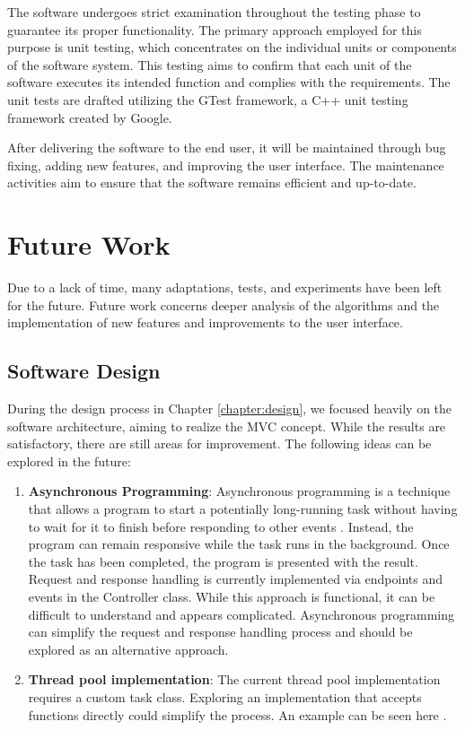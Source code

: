 The software undergoes strict examination throughout the testing phase to guarantee its proper functionality. The primary approach employed for this purpose is unit testing, which concentrates on the individual units or components of the software system. This testing aims to confirm that each unit of the software executes its intended function and complies with the requirements. The unit tests are drafted utilizing the GTest framework, a C++ unit testing framework created by Google.

After delivering the software to the end user, it will be maintained through bug fixing, adding new features, and improving the user interface. The maintenance activities aim to ensure that the software remains efficient and up-to-date.

\section{Future Work}

Due to a lack of time, many adaptations, tests, and experiments have been left for the future. Future work concerns deeper analysis of the algorithms and the implementation of new features and improvements to the user interface.

\subsection{Software Design}

During the design process in Chapter \ref{chapter:design}, we focused heavily on the software architecture, aiming to realize the MVC concept. While the results are satisfactory, there are still areas for improvement. The following ideas can be explored in the future:

\begin{enumerate}
    \item \textbf{Asynchronous Programming}: Asynchronous programming is a technique that allows a program to start a potentially long-running task without having to wait for it to finish before responding to other events \cite{MozDevNet}. Instead, the program can remain responsive while the task runs in the background. Once the task has been completed, the program is presented with the result. Request and response handling is currently implemented via endpoints and events in the Controller class. While this approach is functional, it can be difficult to understand and appears complicated. Asynchronous programming can simplify the request and response handling process and should be explored as an alternative approach.
    \item \textbf{Thread pool implementation}: The current thread pool implementation requires a custom task class. Exploring an implementation that accepts functions directly could simplify the process. An example can be seen here \cite{Mtrebi}.
\end{enumerate}

